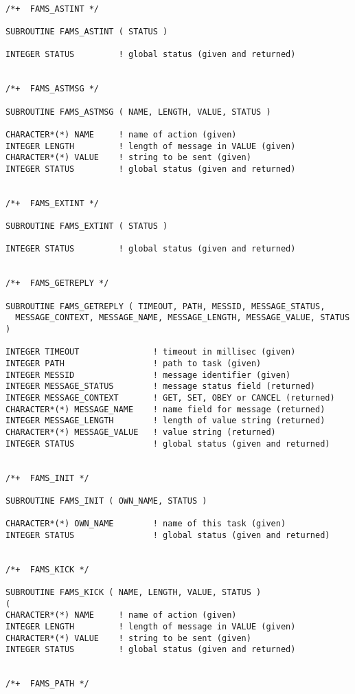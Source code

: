 \begin{verbatim}

/*+  FAMS_ASTINT */

SUBROUTINE FAMS_ASTINT ( STATUS )

INTEGER STATUS         ! global status (given and returned)    


/*+  FAMS_ASTMSG */

SUBROUTINE FAMS_ASTMSG ( NAME, LENGTH, VALUE, STATUS )

CHARACTER*(*) NAME     ! name of action (given)
INTEGER LENGTH         ! length of message in VALUE (given)
CHARACTER*(*) VALUE    ! string to be sent (given)
INTEGER STATUS         ! global status (given and returned)    


/*+  FAMS_EXTINT */

SUBROUTINE FAMS_EXTINT ( STATUS )

INTEGER STATUS         ! global status (given and returned)    


/*+  FAMS_GETREPLY */

SUBROUTINE FAMS_GETREPLY ( TIMEOUT, PATH, MESSID, MESSAGE_STATUS,
  MESSAGE_CONTEXT, MESSAGE_NAME, MESSAGE_LENGTH, MESSAGE_VALUE, STATUS )

INTEGER TIMEOUT               ! timeout in millisec (given)
INTEGER PATH                  ! path to task (given)
INTEGER MESSID                ! message identifier (given)
INTEGER MESSAGE_STATUS        ! message status field (returned)
INTEGER MESSAGE_CONTEXT       ! GET, SET, OBEY or CANCEL (returned)
CHARACTER*(*) MESSAGE_NAME    ! name field for message (returned)
INTEGER MESSAGE_LENGTH        ! length of value string (returned)
CHARACTER*(*) MESSAGE_VALUE   ! value string (returned)
INTEGER STATUS                ! global status (given and returned)    


/*+  FAMS_INIT */

SUBROUTINE FAMS_INIT ( OWN_NAME, STATUS )

CHARACTER*(*) OWN_NAME        ! name of this task (given)
INTEGER STATUS                ! global status (given and returned)    


/*+  FAMS_KICK */

SUBROUTINE FAMS_KICK ( NAME, LENGTH, VALUE, STATUS )
(
CHARACTER*(*) NAME     ! name of action (given)
INTEGER LENGTH         ! length of message in VALUE (given)
CHARACTER*(*) VALUE    ! string to be sent (given)
INTEGER STATUS         ! global status (given and returned)    


/*+  FAMS_PATH */


\end{verbatim}
